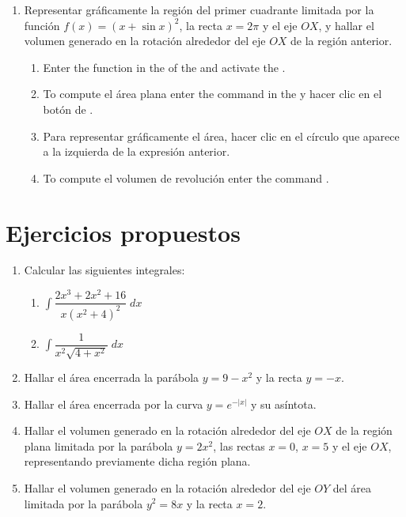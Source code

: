 \begin{enumerate}[leftmargin=*]
\item Representar gráficamente la región del primer cuadrante limitada por la función $f(x)=(x+\sin x)^2$, la recta $x=2\pi$ y el eje $OX$, y hallar el volumen generado en la rotación alrededor del eje $OX$ de la región anterior.
      \begin{indication}
      \begin{enumerate}
      \item Enter the function  in the  of the  and activate the .
      \item To compute el área plana enter the command  in the  y hacer clic en el botón de .
      \item Para representar gráficamente el área, hacer clic en el círculo que aparece a la izquierda de la expresión anterior.
      \item To compute el volumen de revolución enter the command .
      \end{enumerate}
      \end{indication}

\end{enumerate}


\section{Ejercicios propuestos}
\begin{enumerate}[leftmargin=*]
\item Calcular las siguientes integrales:
      \begin{enumerate}
      \item $ \int{\dfrac{2x^{3}+2x^{2}+16}{x(x^{2}+4)^{2}}\;dx}$
      \item $ \int{\dfrac{1}{x^{2}\sqrt{4+x^{2}}}\;dx}$
      \end{enumerate}

\item Hallar el área encerrada la parábola $y=9-x^{2}$ y la recta $y=-x$.

\item Hallar el área encerrada por la curva $y=e^{-|x|}$ y su asíntota.

\item Hallar el volumen generado en la rotación alrededor del eje $OX$ de la región plana limitada por la parábola $y=2x^{2}$, las rectas
      $x=0$, $x=5$ y el eje $OX$, representando previamente dicha región plana.

\item Hallar el volumen generado en la rotación alrededor del eje $OY$ del área limitada por la parábola $y^{2}=8x$ y la recta $x=2$.

\end{enumerate}
